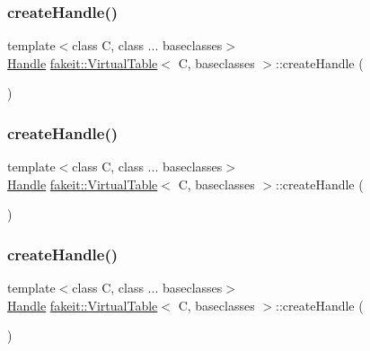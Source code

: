 \subsubsection{\texorpdfstring{createHandle()}{createHandle()}\hspace{0.1cm}{\footnotesize\ttfamily [6/10]}}
{\footnotesize\ttfamily template$<$class C, class ... baseclasses$>$ \\
\mbox{\hyperlink{classfakeit_1_1VirtualTable_1_1Handle}{Handle}} \mbox{\hyperlink{structfakeit_1_1VirtualTable}{fakeit\+::\+Virtual\+Table}}$<$ C, baseclasses $>$\+::create\+Handle (\begin{DoxyParamCaption}{ }\end{DoxyParamCaption})\hspace{0.3cm}{\ttfamily [inline]}}

\mbox{\label{structfakeit_1_1VirtualTable_a616ff0e7567c8c5f368faff1dca949df}} 
\subsubsection{\texorpdfstring{createHandle()}{createHandle()}\hspace{0.1cm}{\footnotesize\ttfamily [7/10]}}
{\footnotesize\ttfamily template$<$class C, class ... baseclasses$>$ \\
\mbox{\hyperlink{classfakeit_1_1VirtualTable_1_1Handle}{Handle}} \mbox{\hyperlink{structfakeit_1_1VirtualTable}{fakeit\+::\+Virtual\+Table}}$<$ C, baseclasses $>$\+::create\+Handle (\begin{DoxyParamCaption}{ }\end{DoxyParamCaption})\hspace{0.3cm}{\ttfamily [inline]}}

\mbox{\label{structfakeit_1_1VirtualTable_a616ff0e7567c8c5f368faff1dca949df}} 
\subsubsection{\texorpdfstring{createHandle()}{createHandle()}\hspace{0.1cm}{\footnotesize\ttfamily [8/10]}}
{\footnotesize\ttfamily template$<$class C, class ... baseclasses$>$ \\
\mbox{\hyperlink{classfakeit_1_1VirtualTable_1_1Handle}{Handle}} \mbox{\hyperlink{structfakeit_1_1VirtualTable}{fakeit\+::\+Virtual\+Table}}$<$ C, baseclasses $>$\+::create\+Handle (\begin{DoxyParamCaption}{ }\end{DoxyParamCaption})\hspace{0.3cm}{\ttfamily [inline]}}

